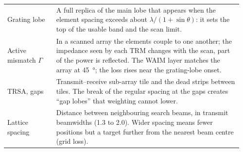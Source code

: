 \documentclass[11pt,a4paper]{article}
\begin{document}
{\begin{longtable}{@{}p{0.2\linewidth}p{0.76\linewidth}@{}}
Grating lobe & A full replica of the main lobe that appears when the element spacing exceeds about $\lambda/(1+\sin\theta)$:
it sets the top of the usable band and the scan limit.\\
Active mismatch $\Gamma$ & In a scanned array the elements couple to one another; the impedance seen by each TRM changes
with the scan, part of the power is reflected. The WAIM layer matches the array at \SI{45}{\degree}; the loss rises
near the grating-lobe onset.\\
TRSA, gaps & Transmit--receive sub-array tile and the dead strips between tiles. The break of the regular spacing at the
gaps creates ``gap lobes'' that weighting cannot lower.\\
Lattice spacing & Distance between neighbouring search beams, in transmit beamwidths (1.3 to 2.0). Wider spacing means
fewer positions but a target further from the nearest beam centre (grid loss).\\
\bottomrule
\end{longtable}}
\end{document}
